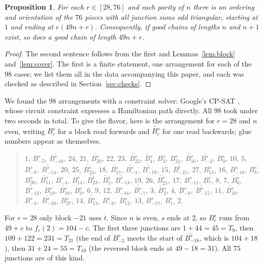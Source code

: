 \documentclass[11pt]{article}
\newtheorem{proposition}[theorem]{Proposition}
\theoremstyle{definition}
\theoremstyle{remark}
\newcommand{\blk}[2]{B^{#2}_{#1}}
\begin{document}
\begin{proposition}\label{prop:step}
For each $r\in[28,76]$ and each parity of $n$ there is an ordering and orientation of the $76$
pieces with all junction sums odd triangular, starting at $1$ and ending at $e(49n+r)$.
Consequently, if good chains of lengths $n$ and $n+1$ exist, so does a good chain of length
$49n+r$.
\end{proposition}

\begin{proof}
The second sentence follows from the first and Lemmas~\ref{lem:block} and~\ref{lem:cover}. The first is
a finite statement, one arrangement for each of the $98$ cases; we list them all in the data
accompanying this paper, and each was checked as described in Section~\ref{sec:checks}.
\end{proof}

We found the $98$ arrangements with a constraint solver: Google's CP-SAT \cite{ortools}, whose
circuit constraint expresses a Hamiltonian path directly. All $98$ took under two seconds in total.
To give the flavor, here is the arrangement for $r=28$ and $n$ even, writing $\blk{c}{s}$ for a
block read forwards and $\overleftarrow{\blk{c}{s}}$ for one read backwards; glue numbers appear
as themselves.
\begin{quote}\small\raggedright
$1$, $\blk{-5}{s}$, $\overleftarrow{\blk{-18}{s}}$, $24$, $21$, $\overleftarrow{\blk{20}{s}}$, $22$, $23,\
\overleftarrow{\blk{22}{s}}$, $\overleftarrow{\blk{4}{s}}$, $\blk{3}{s}$, $\blk{21}{s},\
\overleftarrow{\blk{16}{s}}$, $\overleftarrow{\blk{-2}{s}}$, $\blk{9}{s}$, $10$, $5$, $\blk{-9}{s},\
\overleftarrow{\blk{-14}{s}}$, $20$, $25$, $\overleftarrow{\blk{24}{s}}$, $18,\
\overleftarrow{\blk{17}{s}}$, $\overleftarrow{\blk{-1}{s}}$, $\overleftarrow{\blk{-19}{s}}$, $15,\
\overleftarrow{\blk{-21}{t}}$, $27$, $\blk{15}{s}$, $16$, $\blk{-10}{s}$, $\blk{8}{s}$, $\blk{26}{s},\
\overleftarrow{\blk{11}{s}}$, $\blk{-4}{s}$, $\blk{14}{s}$, $\overleftarrow{\blk{23}{s}},\
\overleftarrow{\blk{5}{s}}$, $\overleftarrow{\blk{-13}{s}}$, $19$, $26$, $\overleftarrow{\blk{25}{s}},\
17$, $\blk{-11}{s}$, $\blk{7}{s}$, $8$, $7$, $\overleftarrow{\blk{6}{s}}$, $\overleftarrow{\blk{-12}{s}},\
\blk{19}{s}$, $\overleftarrow{\blk{18}{s}}$, $\overleftarrow{\blk{0}{s}}$, $6$, $9$, $12,\
\blk{-16}{s}$, $\overleftarrow{\blk{-7}{s}}$, $3$, $\overleftarrow{\blk{2}{s}}$, $4$, $\blk{-8}{s},\
\overleftarrow{\blk{-15}{s}}$, $11$, $\overleftarrow{\blk{10}{s}}$, $\blk{-3}{s},\
\overleftarrow{\blk{-20}{s}}$, $\blk{27}{s}$, $14$, $\overleftarrow{\blk{13}{s}}$, $\blk{-6}{s},\
\blk{12}{s}$, $13$, $\blk{-17}{s}$, $\blk{1}{s}$, $2$.
\end{quote}
For $r=28$ only block $-21$ uses $t$. Since $n$ is even, $s$ ends at $2$, so $\blk{c}{s}$ runs
from $49+c$ to $f_c(2)=104-c$. The first three junctions are $1+44=45=T_9$, then $109+122=231=T_{21}$
(the end of $\blk{-5}{s}$ meets the start of $\overleftarrow{\blk{-18}{s}}$, which is $104+18$), then
$31+24=55=T_{10}$ (the reversed block ends at $49-18=31$). All $75$ junctions are of this kind.
\end{document}
